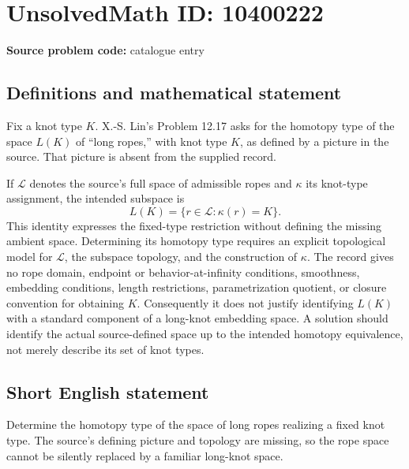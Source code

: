 \documentclass[11pt]{article}
\begin{document}
\section*{UnsolvedMath ID: 10400222}
\textbf{Source problem code:} catalogue entry
\subsection{Definitions and mathematical statement}
Fix a knot type \(K\). X.-S. Lin's Problem 12.17 asks for the homotopy type of the space \(L(K)\) of ``long ropes,'' with knot type \(K\), as defined by a picture in the source. That picture is absent from the supplied record.

If \(\mathcal L\) denotes the source's full space of admissible ropes and \(\kappa\) its knot-type assignment, the intended subspace is
\[
 L(K)=\{r\in\mathcal L:\kappa(r)=K\}.
\]
This identity expresses the fixed-type restriction without defining the missing ambient space. Determining its homotopy type requires an explicit topological model for \(\mathcal L\), the subspace topology, and the construction of \(\kappa\). The record gives no rope domain, endpoint or behavior-at-infinity conditions, smoothness, embedding conditions, length restrictions, parametrization quotient, or closure convention for obtaining \(K\). Consequently it does not justify identifying \(L(K)\) with a standard component of a long-knot embedding space. A solution should identify the actual source-defined space up to the intended homotopy equivalence, not merely describe its set of knot types.
\subsection{Short English statement}
Determine the homotopy type of the space of long ropes realizing a fixed knot type. The source's defining picture and topology are missing, so the rope space cannot be silently replaced by a familiar long-knot space.
\end{document}
